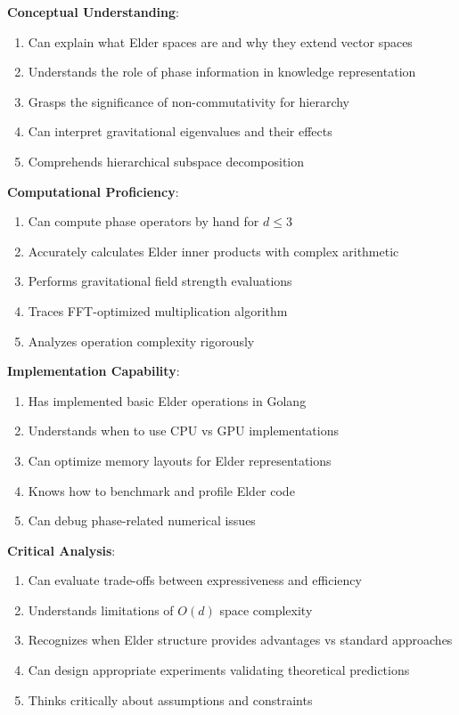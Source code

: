 \begin{tcolorbox}[colback=green!5,colframe=green!50!black,title=Chapter 1 Mastery Checklist]

\textbf{Conceptual Understanding}:
\begin{enumerate}[label=$\square$]
\item Can explain what Elder spaces are and why they extend vector spaces
\item Understands the role of phase information in knowledge representation
\item Grasps the significance of non-commutativity for hierarchy
\item Can interpret gravitational eigenvalues and their effects
\item Comprehends hierarchical subspace decomposition
\end{enumerate}

\textbf{Computational Proficiency}:
\begin{enumerate}[label=$\square$]
\item Can compute phase operators by hand for $d \leq 3$
\item Accurately calculates Elder inner products with complex arithmetic
\item Performs gravitational field strength evaluations
\item Traces FFT-optimized multiplication algorithm
\item Analyzes operation complexity rigorously
\end{enumerate}

\textbf{Implementation Capability}:
\begin{enumerate}[label=$\square$]
\item Has implemented basic Elder operations in Golang
\item Understands when to use CPU vs GPU implementations
\item Can optimize memory layouts for Elder representations
\item Knows how to benchmark and profile Elder code
\item Can debug phase-related numerical issues
\end{enumerate}

\textbf{Critical Analysis}:
\begin{enumerate}[label=$\square$]
\item Can evaluate trade-offs between expressiveness and efficiency
\item Understands limitations of $O(d)$ space complexity
\item Recognizes when Elder structure provides advantages vs standard approaches
\item Can design appropriate experiments validating theoretical predictions
\item Thinks critically about assumptions and constraints
\end{enumerate}


\end{tcolorbox}
